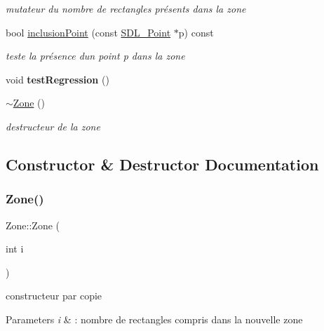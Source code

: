 \begin{DoxyCompactItemize}
\begin{DoxyCompactList}\small\item\em mutateur du nombre de rectangles présents dans la zone \end{DoxyCompactList}\item 
bool \hyperlink{class_zone_a187bd444ec09f9ec44a86456c5b84611}{inclusion\+Point} (const \hyperlink{struct_s_d_l___point}{S\+D\+L\+\_\+\+Point} $\ast$p) const
\begin{DoxyCompactList}\small\item\em teste la présence d\textquotesingle{}un point p dans la zone \end{DoxyCompactList}\item 
\mbox{\label{class_zone_a2e4081537d40f5a08a78645a632b2230}} 
void {\bfseries test\+Regression} ()
\item 
\mbox{\label{class_zone_a562607cb5c4120a9316c5e967a5c610b}} 
\hyperlink{class_zone_a562607cb5c4120a9316c5e967a5c610b}{$\sim$\+Zone} ()
\begin{DoxyCompactList}\small\item\em destructeur de la zone \end{DoxyCompactList}\end{DoxyCompactItemize}


\subsection{Constructor \& Destructor Documentation}
\mbox{\label{class_zone_ac28e36a038ec6cb04ca2fdda3c5de592}} 
\subsubsection{\texorpdfstring{Zone()}{Zone()}}
{\footnotesize\ttfamily Zone\+::\+Zone (\begin{DoxyParamCaption}\item[{int}]{i }\end{DoxyParamCaption})}



constructeur par copie 


\begin{DoxyParams}{Parameters}
{\em i} & \+: nombre de rectangles compris dans la nouvelle zone \\
\hline
\end{DoxyParams}


